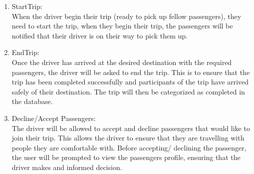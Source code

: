 \documentclass[hidelinks, 12pt, a4paper]{article}
\begin{document}
\begin{enumerate}[label=U1.\arabic*]
\begin{enumerate}[label=U1.\arabic*]
                \item StartTrip: \\
                When the driver begin their trip (ready to pick up fellow passengers), they need to start the trip, when they begin their trip, the passengers will be notified that their driver is on their way to pick them up.\\
                
                \item EndTrip:\\
                Once the driver has arrived at the desired destination with the required passengers, the driver will be asked to end the trip. This is to ensure that the trip has been completed successfully and participants of the trip have arrived safely of their destination. The trip will then be categorized  as completed in the database.\\

                \item Decline/Accept Passengers:\\
                The driver will be allowed to accept and decline passengers that would like to join their trip. This allows the driver to ensure that they are travelling with people they are comfortable with. Before accepting/ declining the passenger, the user will be prompted to view the passengers profile, ensuring that the driver makes and informed decision.\\
                	
            \end{enumerate}

 \end{enumerate}


    
\end{document}
